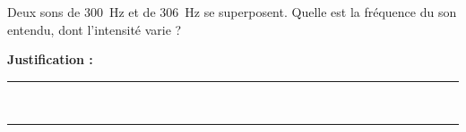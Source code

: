 Deux sons de \qty{300}{Hz} et de \qty{306}{Hz} se superposent. Quelle est la fréquence du son entendu, dont l'intensité varie ?

\choices

\noindent\textbf{Justification :} \hrulefill \\[2.5ex]
\rule{\linewidth}{0.4pt} \\[2.5ex]
\rule{\linewidth}{0.4pt}
\vfill
